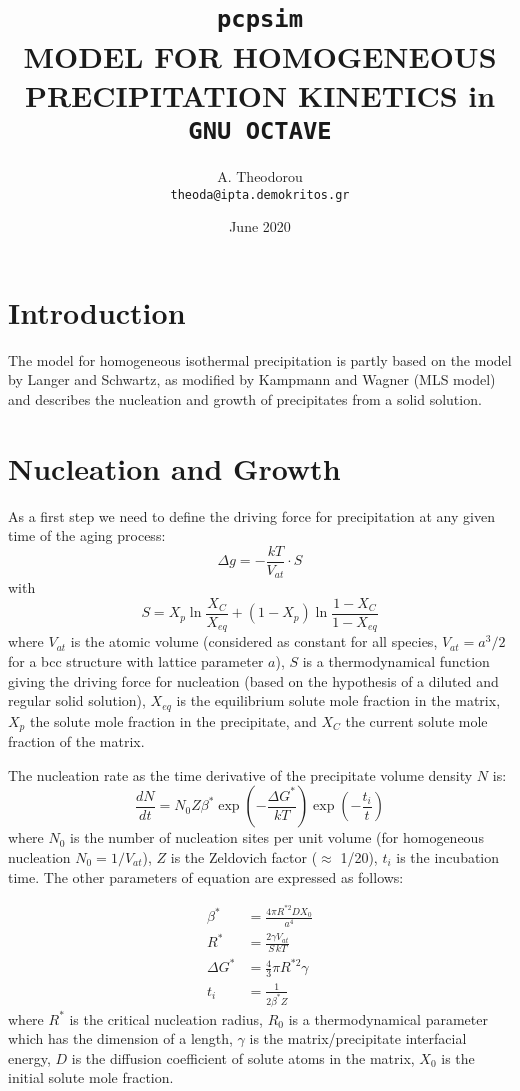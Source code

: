\documentclass[12pt,a4paper]{article}
\author{
  A. Theodorou\\
  \texttt{theoda@ipta.demokritos.gr}
}
\date{June 2020}
\title{\texttt{pcpsim} \\ 
MODEL FOR HOMOGENEOUS PRECIPITATION KINETICS in \texttt{GNU OCTAVE}
}
\begin{document}
\maketitle

\section{Introduction}
The model for homogeneous isothermal precipitation is partly based on the model by Langer and Schwartz, as modified by Kampmann and Wagner (MLS model) and describes the nucleation and growth of  precipitates from a solid solution.


\section{Nucleation and Growth}

As a first step we need to define the driving force for precipitation at any given time of the aging process: 
\begin{equation}
\Delta g = - \frac{kT}{V_{at}} \cdot S 
\end{equation}
with
\begin{equation}
S =  X_p \ln\frac{X_C}{X_{eq}} + (1 - X_p) \ln\frac{1 - X_C}{1-X_{eq}} 
\end{equation}
where $V_{at}$ is the atomic volume (considered as constant for all species, $V_{at}=a^3/2$ for a bcc structure with lattice parameter $a$), $S$ is a thermodynamical function giving the driving force for nucleation (based
on the hypothesis of a diluted and regular solid solution), $X_{eq}$ is the equilibrium solute mole fraction in the matrix, $X_p$ the solute mole fraction in the precipitate, and $X_C$ the current solute mole fraction of the matrix.

The nucleation rate as the time derivative of the precipitate volume density $N$ is:
\begin{equation}
\label{P_density}
\frac{d N}{d t} = N_0 Z \beta^* \exp(-\frac{\Delta G^*}{kT}) \exp(-\frac{t_i}{t})
\end{equation}
where $N_0$ is the number of nucleation sites per unit volume (for homogeneous nucleation $N_0 = 1/ V_{at}$), $Z$ is the Zeldovich factor ($\approx$ 1/20), $t_i$ is the incubation time. The other parameters of equation are expressed as follows:

\begin{subequations}
	\begin{align}
\beta^* &= \frac{4\pi R^{*2} D X_{0}}{a^4} \\
R^* &= \frac{2\gamma V_{at}}{S\,kT} \\
\Delta G^* &= \frac{4}{3}\pi R^{*2}\gamma \\
t_i &= \frac{1}{2\beta^* Z} 
	\end{align}	
\end{subequations}
where $R^*$ is the critical nucleation radius, $R_0$ is a thermodynamical parameter
which has the dimension of a length, $\gamma$ is the matrix/precipitate interfacial energy, $D$ is the diffusion coefficient of solute atoms in the matrix, $X_{0}$ is the initial solute mole fraction.
\end{document}
